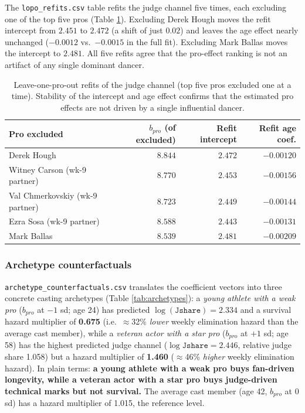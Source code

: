 The \texttt{lopo\_refits.csv} table refits the judge channel five times, each excluding
one of the top five pros (Table \ref{tab:lopo}). Excluding Derek Hough moves the refit
intercept from $2.451$ to $2.472$ (a shift of just $0.02$) and leaves the age effect
nearly unchanged ($-0.0012$ vs.\ $-0.0015$ in the full fit). Excluding Mark Ballas
moves the intercept to $2.481$. All five refits agree that the pro-effect ranking is
not an artifact of any single dominant dancer.

\begin{table}[H]
\centering
\caption{Leave-one-pro-out refits of the judge channel (top five pros excluded one at a
time). Stability of the intercept and age effect confirms that the estimated pro
effects are not driven by a single influential dancer.}
\label{tab:lopo}
\small
\begin{tabular}{lrrr}
\toprule
Pro excluded & $b_{pro}$ (of excluded) & Refit intercept & Refit age coef.\\
\midrule
Derek Hough & $8.844$ & $2.472$ & $-0.00120$\\
Witney Carson (wk-9 partner) & $8.770$ & $2.453$ & $-0.00156$\\
Val Chmerkovskiy (wk-9 partner) & $8.723$ & $2.449$ & $-0.00144$\\
Ezra Sosa (wk-9 partner) & $8.588$ & $2.443$ & $-0.00131$\\
Mark Ballas & $8.539$ & $2.481$ & $-0.00209$\\
\bottomrule
\end{tabular}
\end{table}

\subsubsection{Archetype counterfactuals}

\texttt{archetype\_counterfactuals.csv} translates the coefficient vectors into three
concrete casting archetypes (Table \ref{tab:archetypes}): a \emph{young athlete with a
weak pro} ($b_{pro}$ at $-1$ sd; age 24) has predicted $\log(\texttt{Jshare}) = 2.334$
and a survival hazard multiplier of \textbf{0.675} (i.e.\ $\approx$32\% \emph{lower}
weekly elimination hazard than the average cast member), while a \emph{veteran actor
with a star pro} ($b_{pro}$ at $+1$ sd; age 58) has the highest predicted judge channel
($\log \texttt{Jshare} = 2.446$, relative judge share 1.058) but a hazard multiplier of
\textbf{1.460} ($\approx$46\% \emph{higher} weekly elimination hazard). In plain terms:
\textbf{a young athlete with a weak pro buys fan-driven longevity, while a veteran
actor with a star pro buys judge-driven technical marks but not survival.} The average
cast member (age 42, $b_{pro}$ at 0 sd) has a hazard multiplier of 1.015, the
reference level.

